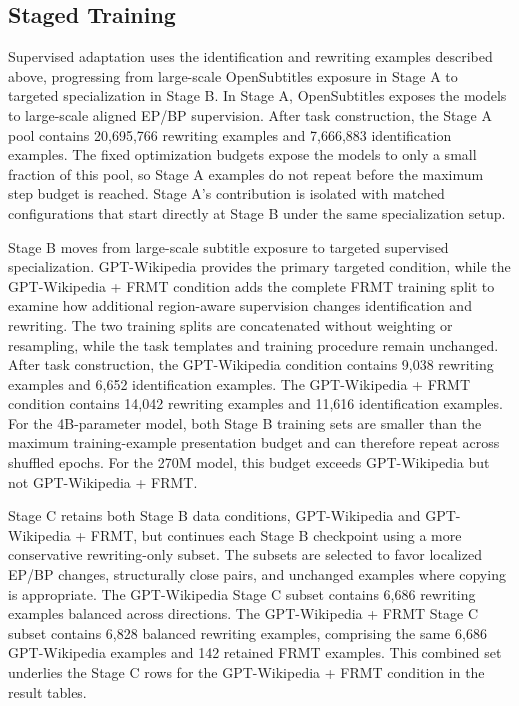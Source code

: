 \documentclass[acmtog,nonacm]{acmart}
\begin{document}
\subsection{Staged Training}
\label{sec:training-procedure}

Supervised adaptation uses the identification and rewriting examples described
above, progressing from large-scale OpenSubtitles exposure in Stage A to
targeted specialization in Stage B. In Stage A, OpenSubtitles exposes the
models to large-scale aligned EP/BP supervision. After task construction, the
Stage A pool contains 20,695,766 rewriting examples and 7,666,883
identification examples. The fixed optimization budgets expose the models to
only a small fraction of this pool, so Stage A examples do not repeat before the
maximum step budget is reached. Stage A's contribution is isolated with matched configurations that start directly at Stage B under the same specialization setup.

Stage B moves from large-scale subtitle exposure to targeted supervised
specialization. GPT-Wikipedia provides the primary targeted condition, while
the GPT-Wikipedia + FRMT condition adds the complete FRMT training split to
examine how additional region-aware supervision changes identification and
rewriting. The two training splits are concatenated without weighting or
resampling, while the task templates and training procedure remain unchanged.
After task construction, the GPT-Wikipedia condition contains 9,038 rewriting
examples and 6,652 identification examples. The GPT-Wikipedia + FRMT condition
contains 14,042 rewriting examples and 11,616 identification examples. For the
4B-parameter model, both Stage B training sets are smaller than the maximum
training-example presentation budget and can therefore repeat across shuffled
epochs. For the 270M model, this budget exceeds GPT-Wikipedia but not GPT-Wikipedia + FRMT.

Stage C retains both Stage B data conditions, GPT-Wikipedia and GPT-Wikipedia + FRMT, but continues each Stage B checkpoint using a more conservative rewriting-only subset. The subsets are selected to favor
localized EP/BP changes, structurally close pairs, and unchanged examples where
copying is appropriate. The GPT-Wikipedia Stage C subset contains 6,686
rewriting examples balanced across directions. The GPT-Wikipedia + FRMT Stage C
subset contains 6,828 balanced rewriting examples, comprising the same 6,686
GPT-Wikipedia examples and 142 retained FRMT examples. This combined set
underlies the Stage C rows for the GPT-Wikipedia + FRMT condition in the result
tables.
\end{document}
